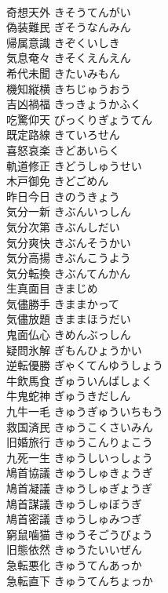 \documentclass[8pt]{extreport}
\begin{document}
\begin{CJK}{UTF8}{min}
\\	奇想天外	きそうてんがい	
\\	偽装難民	ぎそうなんみん	
\\	帰属意識	きぞくいしき	
\\	気息奄々	きそくえんえん	
\\	希代未聞	きたいみもん	
\\	機知縦横	きちじゅうおう	
\\	吉凶禍福	きっきょうかふく	
\\	吃驚仰天	びっくりぎょうてん	
\\	既定路線	きていろせん	
\\	喜怒哀楽	きどあいらく	
\\	軌道修正	きどうしゅうせい	
\\	木戸御免	きどごめん	
\\	昨日今日	きのうきょう	
\\	気分一新	きぶんいっしん	
\\	気分次第	きぶんしだい	
\\	気分爽快	きぶんそうかい	
\\	気分高揚	きぶんこうよう	
\\	気分転換	きぶんてんかん	
\\	生真面目	きまじめ	
\\	気儘勝手	きままかって	
\\	気儘放題	きままほうだい	
\\	鬼面仏心	きめんぶっしん	
\\	疑問氷解	ぎもんひょうかい	
\\	逆転優勝	ぎゃくてんゆうしょう	
\\	牛飲馬食	ぎゅういんばしょく	
\\	牛鬼蛇神	ぎゅうきだしん	
\\	九牛一毛	きゅうぎゅういちもう	
\\	救国済民	きゅうこくさいみん	
\\	旧婚旅行	きゅうこんりょこう	
\\	九死一生	きゅうしいっしょう	
\\	鳩首協議	きゅうしゅきょうぎ	
\\	鳩首凝議	きゅうしゅぎょうぎ	
\\	鳩首謀議	きゅうしゅぼうぎ	
\\	鳩首密議	きゅうしゅみつぎ	
\\	窮鼠噛猫	きゅうそごうびょう	
\\	旧態依然	きゅうたいいぜん	
\\	急転悪化	きゅうてんあっか	
\\	急転直下	きゅうてんちょっか	

\end{CJK}
\end{document}
